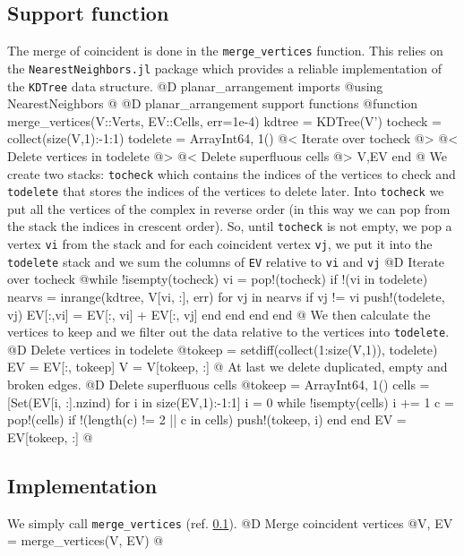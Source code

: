 \subsection{Support function}
\label{sec:merge_vertices}
The merge of coincident is done in the \texttt{merge\_vertices}
function. This relies on the \texttt{NearestNeighbors.jl} package\cite{NearestNeighbors}
which provides a reliable implementation of the \texttt{KDTree} data structure.
@D planar\_arrangement imports
@{using NearestNeighbors
@}
@D planar\_arrangement support functions
@{function merge_vertices(V::Verts, EV::Cells, err=1e-4)
    kdtree = KDTree(V')
    tocheck = collect(size(V,1):-1:1)
    todelete = Array{Int64, 1}()
    @< Iterate over tocheck @>
    @< Delete vertices in todelete @>
    @< Delete superfluous cells @>
    V,EV
end
@}
We create two stacks: \texttt{tocheck} which contains the indices of the vertices
to check and \texttt{todelete} that stores the indices of the vertices to delete later.
Into \texttt{tocheck} we put all the vertices of the complex in reverse order (in
this way we can pop from the stack the indices in crescent order). So, until \texttt{tocheck} is not empty,
we pop a vertex \texttt{vi} from the stack and for each coincident vertex \texttt{vj}, we put it 
into the \texttt{todelete} stack and we sum the columns of \texttt{EV} relative to \texttt{vi} and \texttt{vj}
@D Iterate over tocheck 
@{while !isempty(tocheck)
    vi = pop!(tocheck)
    if !(vi in todelete)
        nearvs = inrange(kdtree, V[vi, :], err)
        for vj in nearvs
            if vj != vi
                push!(todelete, vj)
                EV[:,vi] = EV[:, vi] + EV[:, vj]
            end
        end
    end
end
@}
We then calculate the vertices to keep and we filter out
the data relative to the vertices into \texttt{todelete}.
@D Delete vertices in todelete
@{tokeep = setdiff(collect(1:size(V,1)), todelete)
EV = EV[:, tokeep]
V = V[tokeep, :]
@}
At last we delete duplicated, empty and broken edges.
@D Delete superfluous cells
@{tokeep = Array{Int64, 1}()
cells = [Set(EV[i, :].nzind) for i in size(EV,1):-1:1]
i = 0
while !isempty(cells)
    i += 1
    c = pop!(cells)
    if !(length(c) != 2 || c in cells)
        push!(tokeep, i)
    end
end
EV = EV[tokeep, :]
@}
\subsection{Implementation}
We simply call \texttt{merge\_vertices} (ref. \ref{sec:merge_vertices}).
@D Merge coincident vertices
@{V, EV = merge_vertices(V, EV)
@}
